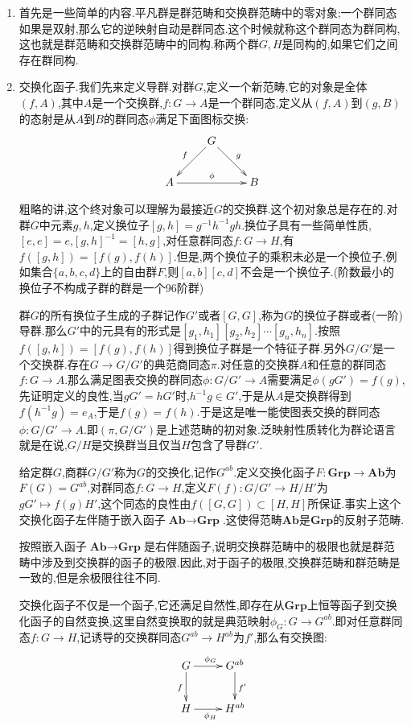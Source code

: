 \begin{enumerate}
	\item
	首先是一些简单的内容.平凡群是群范畴和交换群范畴中的零对象;一个群同态如果是双射,那么它的逆映射自动是群同态.这个时候就称这个群同态为群同构,这也就是群范畴和交换群范畴中的同构.称两个群$G,H$是同构的,如果它们之间存在群同构.
	\item
	交换化函子.我们先来定义导群.对群$G$,定义一个新范畴,它的对象是全体$(f,A)$,其中$A$是一个交换群,$f:G\to A$是一个群同态,定义从$(f,A)$到$(g,B)$的态射是从$A$到$B$的群同态$\phi$满足下面图标交换:
	$$\xymatrix{
		&G\ar[dl]_f\ar[dr]^g&\\
		A\ar[rr]^{\phi}&&B
	}$$
	
	粗略的讲,这个终对象可以理解为最接近$G$的交换群.这个初对象总是存在的.对群$G$中元素$g,h$,定义换位子$[g,h]=g^{-1}h^{-1}gh$.换位子具有一些简单性质,$[e,e]=e$,$[g,h]^{-1}=[h,g]$,对任意群同态$f:G\to H$,有$f([g,h])=[f(g),f(h)]$.但是,两个换位子的乘积未必是一个换位子,例如集合$\{a,b,c,d\}$上的自由群$F$,则$[a,b][c,d]$不会是一个换位子.(阶数最小的换位子不构成子群的群是一个96阶群)
	
	群$G$的所有换位子生成的子群记作$G'$或者$[G,G]$,称为$G$的换位子群或者(一阶)导群.那么$G'$中的元具有的形式是$[g_1,h_1][g_2,h_2]\cdots[g_n,h_n]$.按照$f([g,h])=[f(g),f(h)]$得到换位子群是一个特征子群.另外$G/G'$是一个交换群.存在$G\to G/G'$的典范商同态$\pi$.对任意的交换群$A$和任意的群同态$f:G\to A$.那么满足图表交换的群同态$\phi:G/G'\to A$需要满足$\phi(gG')=f(g)$,先证明定义的良性,当$gG'=hG'$时,$h^{-1}g\in G'$,于是从$A$是交换群得到$f(h^{-1}g)=e_A$,于是$f(g)=f(h)$.于是这是唯一能使图表交换的群同态$\phi:G/G'\to A$.即$(\pi,G/G')$是上述范畴的初对象.泛映射性质转化为群论语言就是在说,$G/H$是交换群当且仅当$H$包含了导群$G'$.
	
	给定群$G$,商群$G/G'$称为$G$的交换化,记作$G^{ab}$.定义交换化函子$F:\textbf{Grp}\to\textbf{Ab}$为$F(G)=G^{ab}$,对群同态$f:G\to H$,定义$F(f):G/G'\to H/H'$为$gG'\mapsto f(g)H'$,这个同态的良性由$f([G,G])\subset[H,H]$所保证.事实上这个交换化函子左伴随于嵌入函子$\textbf{Ab}\to\textbf{Grp}$.这使得范畴$\textbf{Ab}$是$\textbf{Grp}$的反射子范畴.
	
	按照嵌入函子$\textbf{Ab}\to\textbf{Grp}$是右伴随函子,说明交换群范畴中的极限也就是群范畴中涉及到交换群的函子的极限.因此,对于函子的极限,交换群范畴和群范畴是一致的,但是余极限往往不同.
	
	交换化函子不仅是一个函子,它还满足自然性,即存在从$\textbf{Grp}$上恒等函子到交换化函子的自然变换,这里自然变换取的就是典范映射$\phi_G:G\to G^{ab}$.即对任意群同态$f:G\to H$,记诱导的交换群同态$G^{ab}\to H^{ab}$为$f'$,那么有交换图:
	$$\xymatrix{G\ar[r]^{\phi_G}\ar[d]_f&G^{ab}\ar[d]^{f'}\\
		H\ar[r]_{\phi_H}&H^{ab}}$$
	

\end{enumerate}

